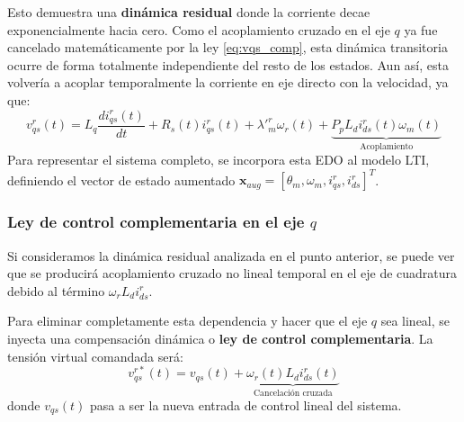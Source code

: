 \documentclass[12pt, a4paper,journal, onecolumn, compsoc]{IEEEtran}
\begin{document}
Esto demuestra una \textbf{dinámica residual} donde la corriente decae exponencialmente hacia cero. Como el acoplamiento cruzado en el eje $q$ ya fue cancelado matemáticamente por la ley \eqref{eq:vqs_comp}, esta dinámica transitoria ocurre de forma totalmente independiente del resto de los estados. 
Aun así, esta volvería a acoplar temporalmente la corriente en eje directo con la velocidad, ya que:
\begin{equation*}
    v_{qs}^r(t) = L_q \dfrac{di_{qs}^r(t)}{dt} + R_s(t)i_{qs}^r(t)+\lambda'^r_m\omega_r(t)+  \underbrace{P_pL_di_{ds}^r(t)\omega_m(t)}_{\text{Acoplamiento}}
\end{equation*}
Para representar el sistema completo, se incorpora esta EDO al modelo LTI, definiendo el vector de estado aumentado $\bm{x}_{aug} = [\theta_m, \omega_m, i_{qs}^r, i_{ds}^r]^T$. 

\subsubsection{Ley de control complementaria en el eje $q$}
Si consideramos la dinámica residual analizada en el punto anterior, se puede ver que se producirá acoplamiento cruzado no lineal temporal en el eje de cuadratura debido al término $\omega_r L_d i_{ds}^r$. 

Para eliminar completamente esta dependencia y hacer que el eje $q$ sea lineal, se inyecta una compensación dinámica o \textbf{ley de control complementaria}. La tensión virtual comandada será:
\begin{equation} \label{eq:vqs_comp}
    v_{qs}^{r*}(t) = v_{qs}(t) + \underbrace{\omega_r(t) L_d i_{ds}^r(t)}_{\text{Cancelación cruzada}}
\end{equation}
donde $v_{qs}(t)$ pasa a ser la nueva entrada de control lineal del sistema.
\end{document}
